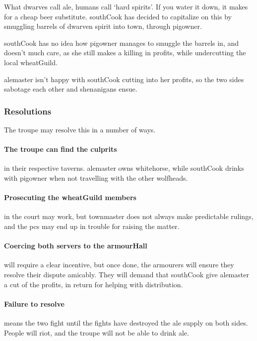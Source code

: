 
\label{troubleAle}

\noindent
What dwarves call ale, humans call `hard spirits'.
If you water it down, it makes for a cheap beer substitute.
\Gls{southCook} has decided to capitalize on this by smuggling barrels of dwarven spirit into \gls{town}, through \gls{pigowner}.

\Gls{southCook} has no idea how \gls{pigowner} manages to smuggle the barrels in, and doesn't much care, as she still makes a killing in profits, while undercutting the local \gls{wheatGuild}.

\Gls{alemaster} isn't happy with \gls{southCook} cutting into her profits, so the two sides sabotage each other and shenanigans ensue.

\subsubsection*{Resolutions}

The troupe may resolve this in a number of ways.

\paragraph{The troupe can find the culprits}
in their respective taverns.
\Gls{alemaster} owns \gls{whitehorse}, while \gls{southCook} drinks with \gls{pigowner} when not travelling with the other \glspl{wolfhead}.

\paragraph{Prosecuting the \gls{wheatGuild} members}
in the \gls{court} may work, but \gls{townmaster} does not always make predictable rulings, and the \glspl{pc} may end up in trouble for raising the matter.%

\paragraph{Coercing both \glspl{server} to the \gls{armourHall}}
will require a clear incentive, but once done, the \glspl{armourer} will ensure they resolve their dispute amicably.
They will demand that \gls{southCook} give \gls{alemaster} a cut of the profits, in return for helping with distribution.
\label{aleResolution}

\paragraph{Failure to resolve}
means the two fight until the fights have destroyed the ale supply on both sides.
People will riot, and the troupe will not be able to drink ale.

